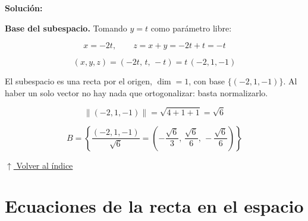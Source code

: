 \documentclass[12pt]{article}
\newcommand{\solucion}{%
    \vspace{0.8em}%
    \textbf{Solución:}%
    \vspace{0.8em}%
}
\newcommand{\volverindice}{%
    \vspace{1em}%
    \begin{flushright}%
        \hyperlink{indice}{\small $\uparrow$ Volver al índice}%
    \end{flushright}%
}
\begin{document}
\begin{enumerate}[label=\alph*.-]
    \solucion

    \textbf{Base del subespacio.} Tomando $y=t$ como parámetro libre:

    \[
    x=-2t,\qquad z=x+y=-2t+t=-t
    \]

    \[
    (x,y,z)=(-2t,\,t,\,-t)=t\,(-2,1,-1)
    \]

    El subespacio es una recta por el origen, $\dim=1$, con base
    $\{(-2,1,-1)\}$. Al haber un solo vector no hay nada que ortogonalizar:
    basta normalizarlo.

    \[
    \|(-2,1,-1)\|=\sqrt{4+1+1}=\sqrt{6}
    \]

    \[
    \boxed{
    B=\left\{\frac{(-2,1,-1)}{\sqrt{6}}
    =\left(-\frac{\sqrt{6}}{3},\,\frac{\sqrt{6}}{6},\,-\frac{\sqrt{6}}{6}\right)
    \right\}
    }
    \]

\end{enumerate}

\volverindice
\newpage


\section{Ecuaciones de la recta en el espacio}
\end{document}
